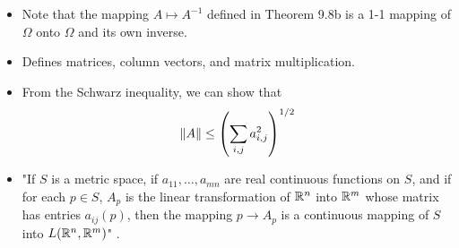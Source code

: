 \documentclass[../notes.tex]{subfiles}
\begin{document}
\begin{itemize}
\begin{enumerate}[label={(\alph*)}]
\begin{proof}
            To prove that $A\mapsto A^{-1}$ is continuous, it will suffice to show that $\norm{B^{-1}-A^{-1}}\to 0$ as $B\to A$. First off, we have by part (a) and the substitution $\vec{x}=B^{-1}\vec{y}$ ($\vec{y}\in\R^n$) that
            \begin{align*}
                (\alpha-\beta)|B^{-1}\vec{y}| &\leq |BB^{-1}\vec{y}| = |\vec{y}|\\
                \left| B^{-1}\left( \frac{\vec{y}}{|\vec{y}|} \right) \right| &\leq (\alpha-\beta)^{-1}
            \end{align*}
            Thus, since $|B^{-1}\vec{u}|$ is bounded by $(\alpha-\beta)^{-1}$ for every unit vector $\vec{u}\in\R^n$, $\norm{B^{-1}}$ is bounded by $(\alpha-\beta)^{-1}$. This combined with the fact that
            \begin{align*}
                B^{-1}-A^{-1} &= B^{-1}I-IA^{-1}\\
                &= B^{-1}AA^{-1}-B^{-1}BA^{-1}\\
                &= B^{-1}(A-B)A^{-1}
            \end{align*}
            implies by Theorem 9.7c that
            \begin{equation*}
                \norm{B^{-1}-A^{-1}} \leq \norm{B^{-1}}\norm{A-B}\norm{A^{-1}}
                \leq (\alpha-\beta)^{-1}\cdot\beta\cdot\frac{1}{\alpha}
                = \frac{\beta}{\alpha(\alpha-\beta)}
            \end{equation*}
            Therefore, since $\beta\to 0$ as $B\to A$, the above inequality establishes the desired result.
        \end{proof}
    \end{enumerate}
    \item Note that the mapping $A\mapsto A^{-1}$ defined in Theorem 9.8b is a 1-1 mapping of $\Omega$ onto $\Omega$ and its own inverse.
    \item Defines matrices, column vectors, and matrix multiplication.
    \item From the Schwarz inequality, we can show that
    \begin{equation*}
        \norm{A} \leq \left( \sum_{i,j}a_{i,j}^2 \right)^{1/2}
    \end{equation*}
    \item "If $S$ is a metric space, if $a_{11},\dots,a_{mn}$ are real continuous functions on $S$, and if for each $p\in S$, $A_p$ is the linear transformation of $\mathbb{R}^n$ into $\mathbb{R}^m$ whose matrix has entries $a_{ij}(p)$, then the mapping $p\to A_p$ is a continuous mapping of $S$ into $L(\mathbb{R}^n,\mathbb{R}^m)$" \parencite[211]{bib:Rudin}.

\end{itemize}
\end{document}
